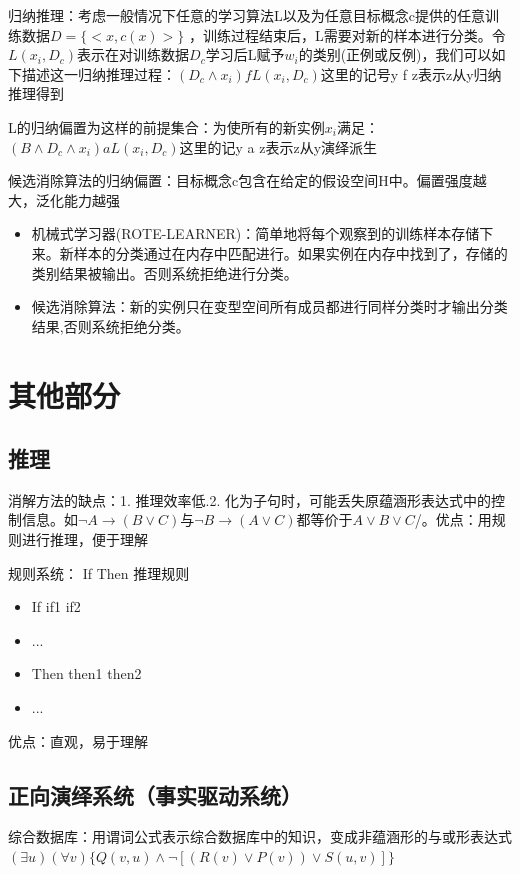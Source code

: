 \documentclass[UTF8,a4paper,landscape,16pt]{paper}
\begin{document}
\begin{multicols}{4}
\noindent 归纳推理：考虑一般情况下任意的学习算法L以及为任意目标概念c提供的任意训练数据$D=\{<x,c(x)>\}$ ，训练过程结束后，L需要对新的样本进行分类。令$L(x_i,D_c)$表示在对训练数据$D_c$学习后L赋予$w_i$的类别(正例或反例)，我们可以如下描述这一归纳推理过程：$(D_c\land x_i)f L(x_i,D_c)$这里的记号y f z表示z从y归纳推理得到

\noindent  L的归纳偏置为这样的前提集合：为使所有的新实例$x_i$满足：$(B\land D_c \land x_i) a L(x_i,D_c)$这里的记y a z表示z从y演绎派生

\noindent 候选消除算法的归纳偏置：目标概念c包含在给定的假设空间H中。偏置强度越大，泛化能力越强
\begin{itemize}
\item 机械式学习器(ROTE-LEARNER)：简单地将每个观察到的训练样本存储下来。新样本的分类通过在内存中匹配进行。如果实例在内存中找到了，存储的类别结果被输出。否则系统拒绝进行分类。
\item 候选消除算法：新的实例只在变型空间所有成员都进行同样分类时才输出分类结果,否则系统拒绝分类。
\end{itemize}
\section{其他部分}
\subsection{推理}
\noindent 消解方法的缺点：1. 推理效率低.2. 化为子句时，可能丢失原蕴涵形表达式中的控制信息。如$\lnot A\rightarrow (B\lor C)$与$\lnot B\rightarrow (A\lor C)$都等价于$A\lor B\lor C$/。优点：用规则进行推理，便于理解
\begin{multicols}{2}
\noindent 规则系统：
\noindent If Then 推理规则
\begin{itemize}
\item If	if1
\subitem if2
\item ...
\item Then then1
\subitem then2
\item ...
\end{itemize}
优点：直观，易于理解
\end{multicols}

\subsection{正向演绎系统（事实驱动系统）}

\noindent 综合数据库：用谓词公式表示综合数据库中的知识，变成非蕴涵形的与或形表达式
$(\exists u)(\forall v)\{Q(v,u)\land \lnot[(R(v)\lor  P(v))\lor S(u,v)]\}$


\end{multicols}
\end{document}
